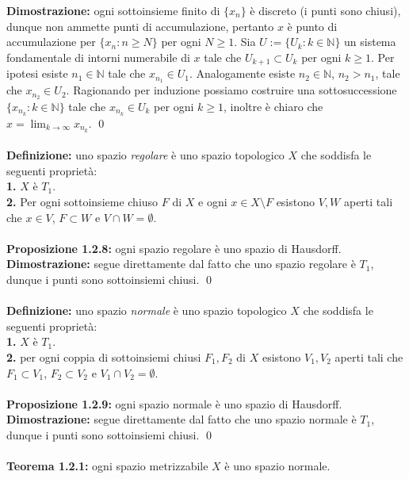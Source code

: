 \documentclass{article}
\begin{document}
\textbf{Dimostrazione:} ogni sottoinsieme finito di $\{ x_n \}$ è discreto (i punti sono chiusi), dunque non ammette punti di accumulazione, pertanto $x$ è punto di accumulazione per $\{ x_n : n \geq N \}$ per ogni $N \geq 1$. Sia $U := \{ U_k : k \in \mathbb{N} \}$ un sistema fondamentale di intorni numerabile di $x$ tale che $U_{k + 1} \subset U_k$ per ogni $k \geq 1$. Per ipotesi esiste $n_1 \in \mathbb{N}$ tale che $x_{n_1} \in U_1$. Analogamente esiste $n_2 \in \mathbb{N}$, $n_2 > n_1$, tale che $x_{n_2} \in U_2$. Ragionando per induzione possiamo costruire una sottosuccessione $\{ x_{n_k} : k \in \mathbb{N} \}$ tale che $x_{n_k} \in U_k$ per ogni $k \geq 1$, inoltre è chiaro che $x = \lim_{k \rightarrow \infty} x_{n_k}$. \qed \\ \\
\textbf{Definizione:} uno spazio \textit{regolare} è uno spazio topologico $X$ che soddisfa le seguenti proprietà: \\
\textbf{1.} $X$ è $T_1$. \\
\textbf{2.} Per ogni sottoinsieme chiuso $F$ di $X$ e ogni $x \in X \setminus F$ esistono $V, W$ aperti tali che $x \in V$, $F \subset W$ e $V \cap W = \emptyset$. \\ \\
\textbf{Proposizione 1.2.8:} ogni spazio regolare è uno spazio di Hausdorff. \\

\textbf{Dimostrazione:} segue direttamente dal fatto che uno spazio regolare è $T_1$, dunque i punti sono sottoinsiemi chiusi. \qed \\ \\
\textbf{Definizione:} uno spazio \textit{normale} è uno spazio topologico $X$ che soddisfa le seguenti proprietà: \\
\textbf{1.} $X$ è $T_1$. \\
\textbf{2.} per ogni coppia di sottoinsiemi chiusi $F_1, F_2$ di $X$ esistono $V_1, V_2$ aperti tali che $F_1 \subset V_1$, $F_2 \subset V_2$ e $V_1 \cap V_2 = \emptyset$. \\ \\
\textbf{Proposizione 1.2.9:} ogni spazio normale è uno spazio di Hausdorff. \\

\textbf{Dimostrazione:} segue direttamente dal fatto che uno spazio normale è $T_1$, dunque i punti sono sottoinsiemi chiusi. \qed \\ \\
\textbf{Teorema 1.2.1:} ogni spazio metrizzabile $X$ è uno spazio normale. \\
\end{document}
